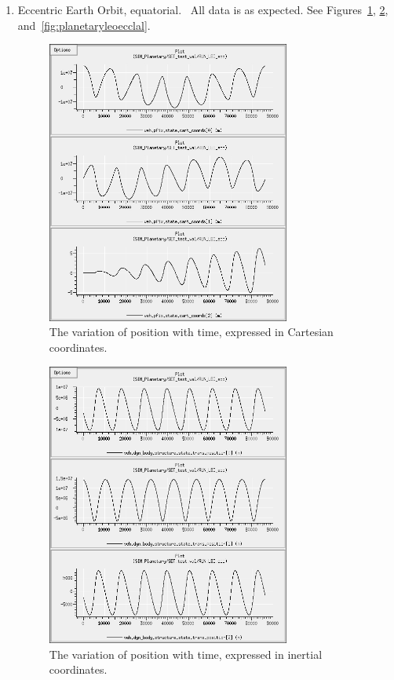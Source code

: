 \begin{description}
\begin{enumerate}
\clearpage

\item {Eccentric Earth Orbit, equatorial.}\ \newline
All data is as expected.  See Figures~\ref{fig:planetaryleoecccart}, \ref{fig:planetaryleoeccinrtl}, and~\ref{fig:planetaryleoecclal}.  

\begin{figure}[!ht]
  \begin{center}
        \includegraphics[width=80mm]{figures/planetary_leo_ecc_cart.jpg}
        \caption{The variation of position with time, expressed in Cartesian coordinates.} 
        \label{fig:planetaryleoecccart}
  \end{center}
\end{figure}

\begin{figure}[!ht]
  \begin{center}
        \includegraphics[width=80mm]{figures/planetary_leo_ecc_inrtl.jpg}
        \caption{The variation of position with time, expressed in inertial coordinates.} 
        \label{fig:planetaryleoeccinrtl}
  \end{center}
\end{figure}


\end{enumerate}
\end{description}
